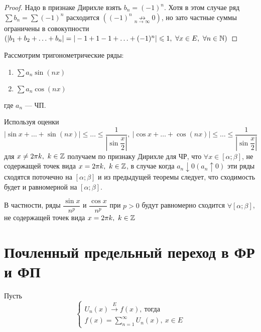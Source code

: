 \documentclass[../../main.tex]{subfiles}
\begin{document}
\begin{proof}
Надо в признаке Дирихле взять $b_n=(-1)^n$. Хотя в этом случае ряд 
$\sum b_n = \sum (-1)^n$ расходится $((-1)^n 
\underset{n \to \infty}{\not \longrightarrow} 0)$, но зато частные суммы
ограничены в совокупности $(|b_1 + b_2 + \ldots + b_n| = 
|-1+1-1+ \ldots + (-1)^n| \leqslant 1,\ \forall x \in E,\ \forall n \in \mathbb{N})$
\end{proof}	

\begin{exmps}
Рассмотрим тригонометрические ряды: 
	\begin{enumerate}
		\item $\sum a_n \sin(nx)$
		\item $\sum a_n \cos(nx)$
	\end{enumerate}
где $a_n$ --- ЧП.

Используя оценки $|\sin x + \ldots + \sin(nx)| 
\leq \ldots \leq \dfrac{1}{|\sin\dfrac{x}{2}|},\
|\cos x + \ldots + \cos(nx)| 
\leq \ldots \leq \dfrac{1}{|\sin\dfrac{x}{2}|}$
для $x \neq 2\pi k,\ k \in \mathbb{Z}$ получаем по признаку Дирихле для ЧР, что
$\forall x \in [\alpha; \beta]$, не содержащей точек вида 
$x = 2\pi k,\ k \in \mathbb{Z}$, в случае когда $a_n \downarrow 0 (a_n \uparrow 0)$ 
эти ряды сходятся поточечно на $[\alpha; \beta]$ и 
из предыдущей теоремы следует, что сходимость будет и равномерной
на $[\alpha; \beta]$.

В частности, ряды $\dfrac{\sin x}{n^p}$ и $\dfrac{\cos x}{n^p}$ при
$p > 0$ будут равномерно сходится $\forall [\alpha; \beta]$, не содержащей
точек вида $x = 2\pi k,\ k \in \mathbb{Z}$ 
\end{exmps}

\section{Почленный предельный переход в ФР и ФП}
Пусть 
\begin{equation}
\label{lec2:15}
\begin{cases}
U_n(x) \overset{E}{\longrightarrow} f(x),\ \text{тогда} \\
f(x) = \sum\limits_{n = 1}^{\infty} U_n(x),\ x \in E
\end{cases}
\end{equation}
\end{document}
